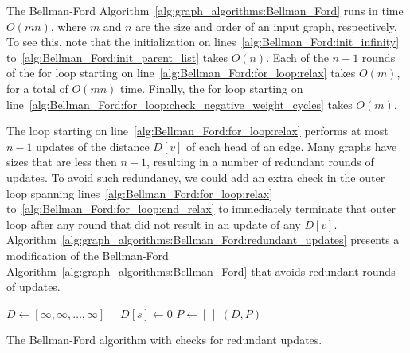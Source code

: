 The Bellman-Ford Algorithm~\ref{alg:graph_algorithms:Bellman_Ford}
runs in time $O(mn)$, where $m$ and $n$ are the size and order of an
input graph, respectively. To see this, note that the initialization
on lines~\ref{alg:Bellman_Ford:init_infinity}
to~\ref{alg:Bellman_Ford:init_parent_list} takes $O(n)$. Each of the
$n - 1$ rounds of the for loop starting on
line~\ref{alg:Bellman_Ford:for_loop:relax} takes $O(m)$, for a total
of $O(mn)$ time. Finally, the for loop starting on
line~\ref{alg:Bellman_Ford:for_loop:check_negative_weight_cycles}
takes $O(m)$.

The loop starting on line~\ref{alg:Bellman_Ford:for_loop:relax}
performs at most $n - 1$ updates of the distance $D[v]$ of each head
of an edge. Many graphs have sizes that are less then $n - 1$,
resulting in a number of redundant rounds of updates. To avoid such
redundancy, we could add an extra check in the outer loop spanning
lines~\ref{alg:Bellman_Ford:for_loop:relax}
to~\ref{alg:Bellman_Ford:for_loop:end_relax} to immediately terminate
that outer loop after any round that did not result in an update of
any $D[v]$.
Algorithm~\ref{alg:graph_algorithms:Bellman_Ford:redundant_updates}
presents a modification of the Bellman-Ford
Algorithm~\ref{alg:graph_algorithms:Bellman_Ford} that avoids
redundant rounds of updates.

\begin{algorithm}[!htpb]
\dontprintsemicolon  %
\BlankLine
$D \leftarrow [\infty, \infty, \dots, \infty]$~~\;
$D[s] \leftarrow 0$\;
$P \leftarrow [\,]$\;
\Return $(D, P)$\;
\caption{The Bellman-Ford algorithm with checks for redundant updates.}
\label{alg:graph_algorithms:Bellman_Ford:redundant_updates}
\end{algorithm}


